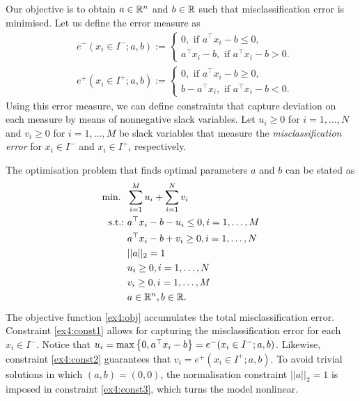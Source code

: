 Our objective is to obtain $a \in \mathbb{R}^n$ and $b \in \mathbb{R}$ such that misclassification error is minimised. Let us define the error measure as
%
\begin{align*}
& e^-(x_i \in I^-; a, b) := 
    \begin{cases} 0, \text{ if } a^\top x_i - b \leq 0, \\
        a^\top x_i - b, \text{ if } a^\top x_i - b > 0.
    \end{cases} \\
& e^+(x_i \in I^+; a, b) := 
    \begin{cases} 0, \text{ if } a^\top x_i - b \geq 0, \\
        b -  a^\top x_i, \text{ if } a^\top x_i - b < 0.
    \end{cases}                   
\end{align*}
%
Using this error measure, we can define constraints that capture deviation on each measure by means of nonnegative slack variables. Let $u_i \geq 0$ for $i = 1, \dots, N$ and $v_i \geq 0$ for $i = 1,\dots, M$ be slack variables that measure the \emph{misclassification error} for $x_i \in I^-$ and $x_i \in I^+$, respectively.

The optimisation problem that finds optimal parameters $a$ and $b$ can be stated as
%
\begin{align}
	\mathop{\text{min.~}} \ & \sum_{i=1}^M u_i + \sum_{i=1}^N v_i \label{ex4:obj}\\
	\mathop{\text{s.t.:~}} & a^\top x_i - b - u_i \leq 0, i = 1, \dots, M \label{ex4:const1} \\
    & a^\top x_i - b + v_i \geq 0, i = 1,\dots,N \label{ex4:const2} \\
    & ||a||_2 = 1 \label{ex4:const3} \\
    & u_i \geq 0, i = 1, \dots, N \\
    & v_i \geq 0, i = 1, \dots, M \\
    & a \in \mathbb{R}^n, b \in \mathbb{R}. \label{ex4:end}   
\end{align} 
%
The objective function \eqref{ex4:obj} accumulates the total misclassification error. Constraint \eqref{ex4:const1} allows for capturing the misclassification error for each $x_i \in I^-$. Notice that $u_i = \max\left\{ 0, a^\top x_i -b \right \} = e^-(x_i \in I^-; a, b)$. Likewise, constraint \eqref{ex4:const2} guarantees that $v_i = e^+(x_i \in I^+; a, b)$.
To avoid trivial solutions in which $(a,b) = (0, 0)$, the normalisation constraint $|| a ||_2 = 1$ is imposed in constraint \eqref{ex4:const3}, which turns the model nonlinear.

